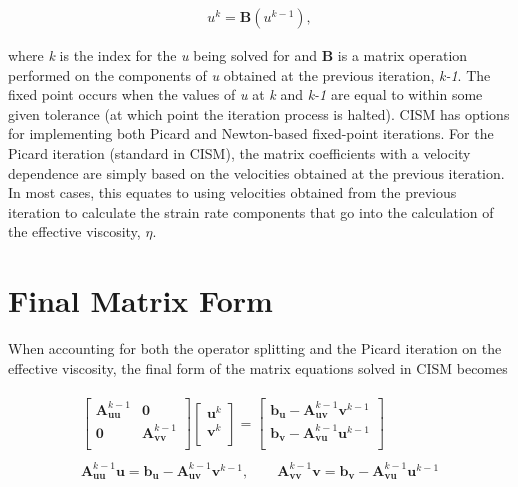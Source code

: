 \begin{align*}
u^{k}=\mathbf{B}\left( u^{k-1} \right),
\end{align*}

where \textit{k} is the index for the \textit{u} being solved for and \textbf{B} is a matrix operation performed on the components of \textit{u} obtained at the previous iteration, \textit{k-1}. The fixed point occurs when the values of \textit{u} at \textit{k} and \textit{k-1} are equal to within some given tolerance (at which point the iteration process is halted). CISM has options for implementing both Picard and Newton-based fixed-point iterations. For the Picard iteration (standard in CISM), the matrix coefficients with a velocity dependence are simply based on the velocities obtained at the previous iteration. In most cases, this equates to using velocities obtained from the previous iteration to calculate the strain rate components that go into the calculation of the effective viscosity, $\eta$.

\section{Final Matrix Form}
When accounting for both the operator splitting and the Picard iteration on the effective viscosity, the final form of the matrix equations solved in CISM becomes 

\begin{align*}
\begin{matrix}
  \left[ \begin{matrix}
   \mathbf{A}_{\mathbf{uu}}^{k-1} & \mathbf{0}  \\
   \mathbf{0} & \mathbf{A}_{\mathbf{vv}}^{k-1}  \\
\end{matrix} \right]\left[ \begin{matrix}
   \mathbf{u}^{k}  \\
   \mathbf{v}^{k}  \\
\end{matrix} \right]=\left[ \begin{matrix}
   \mathbf{b}_{\mathbf{u}}-\mathbf{A}_{\mathbf{uv}}^{k-1}\mathbf{v}^{k-1}  \\
   \mathbf{b}_{\mathbf{v}}-\mathbf{A}_{\mathbf{vu}}^{k-1}\mathbf{u}^{k-1}  \\
\end{matrix} \right] \\ 
   \\ 
  \mathbf{A}_{\mathbf{uu}}^{k-1}\mathbf{u}=\mathbf{b}_{\mathbf{u}}-\mathbf{A}_{\mathbf{uv}}^{k-1}\mathbf{v}^{k-1},\quad \quad \mathbf{A}_{\mathbf{vv}}^{k-1}\mathbf{v}=\mathbf{b}_{\mathbf{v}}-\mathbf{A}_{\mathbf{vu}}^{k-1}\mathbf{u}^{k-1} \\ 
\end{matrix}
\end{align*}

